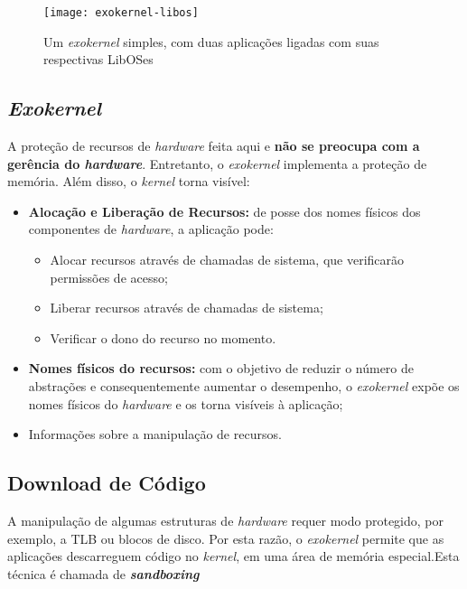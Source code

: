 \begin{figure}
  \centering
  \texttt{[image: exokernel-libos]}
  \caption{Um \textit{exokernel} simples, com duas aplicações ligadas com suas respectivas LibOSes}
  \label{fig:exokernel-libos}
\end{figure}

\subsection{\textit{Exokernel}}
A proteção de recursos de \textit{hardware} feita aqui e \textbf{não se preocupa com a gerência do \textit{hardware}}. Entretanto, o \textit{exokernel} implementa a proteção de memória. Além disso, o \textit{kernel} torna visível:
\begin{itemize}

  \item \textbf{Alocação e Liberação de Recursos:} de posse dos nomes físicos dos componentes de \textit{hardware}, a aplicação pode:
  \begin{itemize}
    \item Alocar recursos através de chamadas de sistema, que verificarão permissões de acesso;

    \item Liberar recursos através de chamadas de sistema;

    \item Verificar o dono do recurso no momento.
  \end{itemize}

  \item \textbf{Nomes físicos do recursos:} com o objetivo de reduzir o número de abstrações e consequentemente aumentar o desempenho, o \textit{exokernel} expõe os nomes físicos do \textit{hardware} e os torna visíveis à aplicação;

  \item Informações sobre a manipulação de recursos.
\end{itemize}


\subsection{Download de Código}
A manipulação de algumas estruturas de \textit{hardware} requer modo protegido, por exemplo, a TLB ou blocos de disco. Por esta razão, o \textit{exokernel} permite que as aplicações descarreguem código no \textit{kernel}, em uma área de memória especial.Esta técnica é chamada de \textbf{\textit{sandboxing}}

